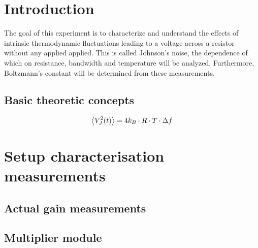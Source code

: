 \tableofcontents
\newpage
\listoffigures

\listoftables

\skippage

\setcounter{page}{1}
\restoregeometry
\thispagestyle{fancy}


\section{Introduction}

The goal of this experiment is to characterize and understand the effects of intrinsic thermodynamic fluctuations leading to a voltage across a resistor without any applied applied. This is called Johnson's noise, the dependence of which on resistance, bandwidth and temperature will be analyzed. Furthermore, Boltzmann's constant will be determined from these measurements.

\subsection{Basic theoretic concepts}


\begin{equation}\label{eq:johnson-expval}
	\expval{V_J^2(t)} = 4k_B \cdot R \cdot T \cdot \Delta f
\end{equation}

\section{Setup characterisation measurements}

\subsection{Actual gain measurements}


\subsection{Multiplier module}


